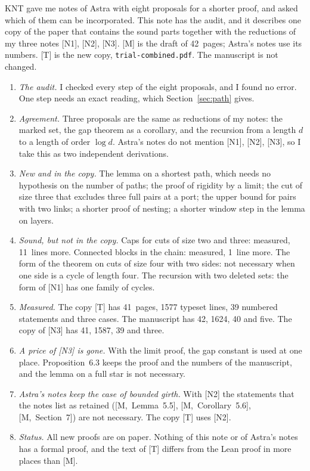 \documentclass[11pt]{article}
\newcommand{\M}[1]{[M,~#1]}
\begin{document}
\maketitleblock

KNT gave me notes of Astra with eight proposals for a shorter proof, and asked which of them can
be incorporated. This note has the audit, and it describes one copy of the paper that contains
the sound parts together with the reductions of my three notes [N1], [N2], [N3]. [M] is the
draft of 42~pages; Astra's notes use its numbers. [T] is the new copy,
\texttt{trial-combined.pdf}. The manuscript is not changed.

\begin{enumerate}[leftmargin=1.6em]
\item \emph{The audit.} I checked every step of the eight proposals, and I found no error. One
step needs an exact reading, which Section~\ref{sec:path} gives.
\item \emph{Agreement.} Three proposals are the same as reductions of my notes: the marked set,
the gap theorem as a corollary, and the recursion from a length $d$ to a length of order
$\log d$. Astra's notes do not mention [N1], [N2], [N3], so I take this as two independent
derivations.
\item \emph{New and in the copy.} The lemma on a shortest path, which needs no hypothesis on the
number of paths; the proof of rigidity by a limit; the cut of size three that excludes three
full pairs at a port; the upper bound for pairs with two links; a shorter proof of nesting; a
shorter window step in the lemma on layers.
\item \emph{Sound, but not in the copy.} Caps for cuts of size two and three: measured, 11~lines
more. Connected blocks in the chain: measured, 1~line more. The form of the theorem on cuts of
size four with two sides: not necessary when one side is a cycle of length four. The recursion
with two deleted sets: the form of [N1] has one family of cycles.
\item \emph{Measured.} The copy [T] has 41~pages, 1577 typeset lines, 39 numbered statements and
three cases. The manuscript has 42, 1624, 40 and five. The copy of [N3] has 41, 1587, 39 and
three.
\item \emph{A price of [N3] is gone.} With the limit proof, the gap constant is used at one
place. Proposition~6.3 keeps the proof and the numbers of the manuscript, and the lemma on a
full star is not necessary.
\item \emph{Astra's notes keep the case of bounded girth.} With [N2] the statements that the
notes list as retained (\M{Lemma~5.5}, \M{Corollary~5.6}, \M{Section~7}) are not necessary.
The copy [T] uses [N2].
\item \emph{Status.} All new proofs are on paper. Nothing of this note or of Astra's notes has a
formal proof, and the text of [T] differs from the Lean proof in more places than [M].
\end{enumerate}
\end{document}
